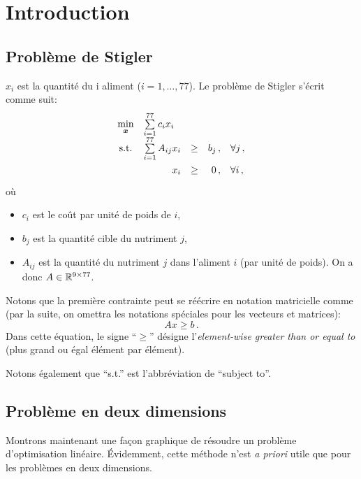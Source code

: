 \section{Introduction}

\subsection{Problème de Stigler}

	$x_i$ est la quantité du i\ieme{} aliment ($i = 1,\dots,77$).
	Le problème de Stigler s'écrit comme suit:
	\begin{equation*}
	\renewcommand{\arraystretch}{1.5}
	\begin{array}{c@{\quad} l c r@{\quad} l}
		\min\limits_{\bm{x}} & \sum\limits_{i = 1}^{77} c_i x_i & & & \\
		\textnormal{s.t.} & \sum\limits_{i = 1}^{77} A_{ij} x_i & \ge & b_j\,, & \forall j\,,\\
		& \multicolumn{1}{r}{x_i} & \ge & 0\,, & \forall i\,,
	\end{array}
	\end{equation*}
	où
	\begin{itemize}
		\item $c_i$ est le coût par unité de poids de $i$,
		\item $b_j$ est la quantité cible du nutriment $j$,
		\item $A_{ij}$ est la quantité du nutriment $j$
		dans l'aliment $i$ (par unité de poids).
		On a donc $A \in \mathbb{R}^{9 \times 77}$.
	\end{itemize}

	Notons que la première contrainte
	peut se réécrire en notation matricielle comme
	(par la suite,
	on omettra les notations spéciales pour les vecteurs et matrices):
	\[
	Ax \ge b\,.
	\]
	Dans cette équation,
	le signe ``$\ge$'' désigne
	l'\emph{element-wise greater than or equal to}
	(plus grand ou égal élément par élément).

	Notons également que ``s.t.'' est l'abbréviation de ``subject to''.

\subsection{Problème en deux dimensions}

	Montrons maintenant une façon graphique
	de résoudre un problème d'optimisation linéaire.
	Évidemment, cette méthode n'est \textit{a priori} utile
	que pour les problèmes en deux dimensions.

